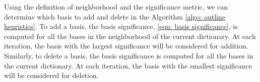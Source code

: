 Using the definition of neighborhood and the significance metric, we can determine which basis
to add and delete in the Algorithm \ref{algo: outline heuristics}. 
To add a basis, the basis significance, \eqref{eqn: basis significance},
is computed for all the bases in the neighborhood of the current dictionary. At each iteration,
the basis with the largest significance will be considered for addition. Similarly, 
to delete a basis, the basis significance is computed for all the bases in the current dictionary.
At each iteration, the basis with the smallest significance will be considered for deletion.\\


